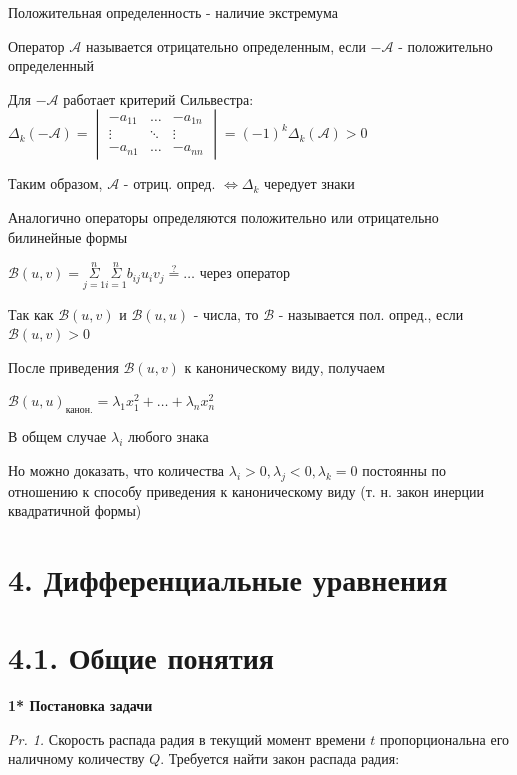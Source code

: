 \documentclass[12pt]{article}
\begin{document}
    Положительная определенность - наличие экстремума

    \Def Оператор $\mathcal{A}$ называется отрицательно определенным, если $-\mathcal{A}$ - положительно определенный

    \Nota Для $-\mathcal{A}$ работает критерий Сильвестра: $\Delta_k(-\mathcal{A}) =
    \begin{vmatrix}-a_{11} & \dots & -a_{1n} \\ \vdots & \ddots & \vdots \\ -a_{n1} & \dots & -a_{nn}\end{vmatrix} = (-1)^k \Delta_k (\mathcal{A}) > 0$

    Таким образом, $\mathcal{A}$ - отриц. опред. $\Longleftrightarrow \Delta_k$ чередует знаки

    \Nota Аналогично операторы определяются положительно или отрицательно билинейные формы

    $\mathcal{B}(u, v) = \overset{n}{\underset{j = 1}{\Sigma}}\overset{n}{\underset{i = 1}{\Sigma}} b_{ij} u_i v_j \stackrel{?}{=} \dots$ через оператор

    Так как $\mathcal{B}(u, v)$ и  $\mathcal{B}(u, u)$ - числа, то $\mathcal{B}$ - называется пол. опред., если $\mathcal{B}(u, v) > 0$

    \Nota После приведения $\mathcal{B}(u, v)$ к каноническому виду, получаем

    $\mathcal{B}(u, u)_{\text{канон.}} = \lambda_1 x_1^2 + \dots + \lambda_n x_n^2$

    В общем случае $\lambda_i$ любого знака

    Но можно доказать, что количества $\lambda_i > 0, \lambda_j < 0, \lambda_k = 0$ постоянны по отношению к способу приведения
    к каноническому виду (т. н. закон инерции квадратичной формы)



    \section{4. Дифференциальные уравнения}

    \section{4.1. Общие понятия}

    \textbf{1* Постановка задачи}

    \textit{Pr. 1.} Скорость распада радия в текущий момент времени $t$ пропорциональна его наличному количеству $Q$. Требуется найти закон распада радия:
\end{document}
